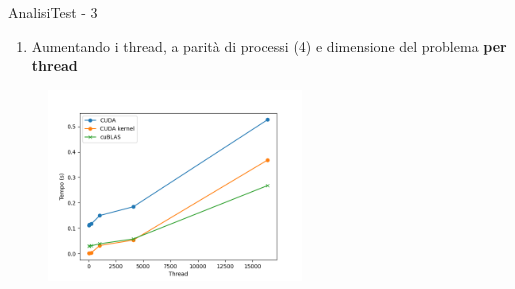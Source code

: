 \begin{frame}{Analisi}{Test - 3}
    \begin{enumerate}
        \item[3.] Aumentando i thread, a parità di processi (4) e dimensione del problema \textbf{per thread}
    \end{enumerate}

    \begin{figure}[H]
        \centering
        \includegraphics[width=0.6\textwidth]{./imgs/graphs/caso_c.png}
    \end{figure}
\end{frame}

